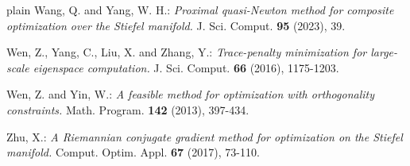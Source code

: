 \documentclass[11pt,reqno]{amsart}
\numberwithin{figure}{section}
\begin{document}
\begin{thebibliography}{plain}
 Wang, Q. and Yang, W. H.: \textit{Proximal quasi-Newton method for composite optimization over the Stiefel manifold.} J. Sci. Comput. {\bf95} (2023), 39. 

 Wen, Z., Yang, C., Liu, X. and Zhang, Y.: \textit{Trace-penalty minimization for large-scale eigenspace computation.} J. Sci. Comput. {\bf66} (2016), 1175-1203. 


 Wen, Z. and Yin, W.: \textit{A feasible method for optimization with orthogonality constraints.} Math. Program. {\bf142} (2013), 397-434. 



 Zhu, X.: \textit{A Riemannian conjugate gradient method for optimization on the Stiefel manifold.} Comput. Optim. Appl. {\bf67} (2017), 73-110. 


\end{thebibliography}
\end{document}
